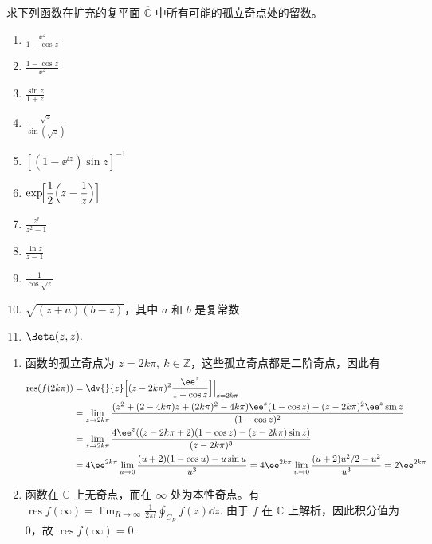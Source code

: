 \begin{question}
求下列函数在扩充的复平面 \(\overline{\mathbb{C}}\) 中所有可能的孤立奇点处的留数。

\begin{enumerate}
  \item \(\displaystyle\frac{\ee^z}{1-\cos z}\)
  \item \(\displaystyle\frac{1-\cos z}{\ee^z}\)
  \item \(\displaystyle\frac{\sin z}{1+z}\)
  \item \(\displaystyle\frac{\sqrt{z}}{\sin(\sqrt{z})}\)
  \item \([(1-\ee^{\ii z})\sin z]^{-1}\)

  \item \(\displaystyle\exp\!\Bigl[\frac12\Bigl(z-\frac1z\Bigr)\Bigr]\)
  \item \(\displaystyle\frac{z^{\ii}}{z^2-1}\)
  \item \(\displaystyle\frac{\ln z}{z-1}\)
  \item \(\displaystyle\frac{1}{\cos\sqrt{z}}\)

  \item \(\displaystyle\sqrt{(z+a)(b-z)}\)，其中 \(a\) 和 \(b\) 是复常数
  \item \(\displaystyle\Beta(z,z).\)
\end{enumerate}
\begin{solution}
\begin{enumerate}
  \item 函数的孤立奇点为 \(z=2k\pi,\ k\in\mathbb{Z}\)，这些孤立奇点都是二阶奇点，因此有
\[
\begin{aligned}
\operatorname{res}(f(2k\pi))&=\Bigl.\dv{}{z}\Bigl[(z-2k\pi)^2\frac{\ee^z}{1-\cos z}\Bigr]\Bigr|_{z=2k\pi}\\
&=\lim_{z\to 2k\pi}\frac{(z^2+(2-4k\pi)z+(2k\pi)^2-4k\pi)\ee^z(1-\cos z)-(z-2k\pi)^2\ee^z\sin z}{(1-\cos z)^2}\\
&=\lim_{z\to2k\pi}\frac{4\ee^z((z-2k\pi+2)(1-\cos z)-(z-2k\pi)\sin z)}{(z-2k\pi)^3}\\
&=4\ee^{2k\pi}\lim_{u\to0}\frac{(u+2)(1-\cos u)-u\sin u}{u^3}=4\ee^{2k\pi}\lim_{u\to0}\frac{(u+2)u^2/2-u^2}{u^3}=2\ee^{2k\pi}
\end{aligned}
\]

  \item 函数在 \(\mathbb{C}\) 上无奇点，而在 \(\infty\) 处为本性奇点。有 \(\operatorname{res}f(\infty)=\displaystyle\lim_{R\to\infty}\frac1{2\pi\ii}\oint_{C_R}f(z)\dd{z}\). 由于 \(f\) 在 \(\mathbb{C}\) 上解析，因此积分值为 0，故 \(\operatorname{res}f(\infty)=0\).


\end{enumerate}
\end{solution}
\end{question}
